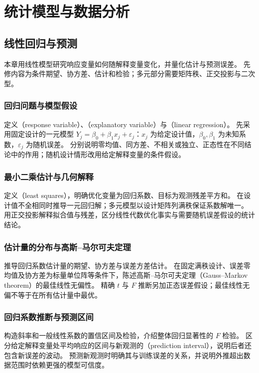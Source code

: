 \documentclass[UTF8,12pt,a4paper,fontset=fandol]{ctexbook}
\begin{document}
\part{统计模型与数据分析}

\chapter{线性回归与预测}
\label{chap:ps-regression}

本章用线性模型研究响应变量如何随解释变量变化，并量化估计与预测误差。
先修内容为条件期望、协方差、估计和检验；多元部分需要矩阵秩、正交投影与二次型。

\section{回归问题与模型假设}
\label{sec:ps-regression-model}
定义（response variable）、（explanatory variable）与（linear regression）。
先采用固定设计的一元模型 $Y_j=\beta_0+\beta_1x_j+\varepsilon_j$：$x_j$ 为给定设计值，$\beta_0,\beta_1$ 为未知系数，$\varepsilon_j$ 为随机误差。
分别说明零均值、同方差、不相关或独立、正态性在不同结论中的作用；随机设计情形改用给定解释变量的条件假设。

\section{最小二乘估计与几何解释}
\label{sec:ps-least-squares}
定义（least squares），明确优化变量为回归系数、目标为观测残差平方和。
在设计值不全相同时推导一元回归解；多元模型以设计矩阵列满秩保证系数解唯一。
用正交投影解释拟合值与残差，区分线性代数优化事实与需要随机误差假设的统计结论。

\section{估计量的分布与高斯--马尔可夫定理}
\label{sec:ps-gauss-markov}
推导回归系数估计量的期望、协方差与误差方差估计。
在固定满秩设计、误差零均值及协方差为标量单位阵等条件下，陈述高斯--马尔可夫定理（Gauss--Markov theorem）的最佳线性无偏性。
精确 $t$ 与 $F$ 推断另加正态误差假设；最佳线性无偏不等于在所有估计量中最优。

\section{回归系数推断与预测区间}
\label{sec:ps-regression-inference}
构造斜率和一般线性系数的置信区间及检验，介绍整体回归显著性的 $F$ 检验。
区分给定解释变量处平均响应的区间与新观测的（prediction interval），说明后者还包含新误差的波动。
预测新观测时明确其与训练误差的关系，并说明外推超出数据范围时依赖更强的模型可信度。
\end{document}
